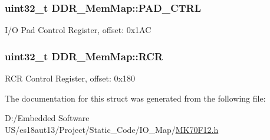 \subsubsection[{P\+A\+D\+\_\+\+C\+T\+R\+L}]{\setlength{\rightskip}{0pt plus 5cm}uint32\+\_\+t D\+D\+R\+\_\+\+Mem\+Map\+::\+P\+A\+D\+\_\+\+C\+T\+R\+L}\label{struct_d_d_r___mem_map_abeb11d4cc28f5bb277d0cd4a46cb2ce1}
I/\+O Pad Control Register, offset\+: 0x1\+A\+C \hypertarget{struct_d_d_r___mem_map_a46f3bdf0cbb782701ad3edd860cfb667}{}
\subsubsection[{R\+C\+R}]{\setlength{\rightskip}{0pt plus 5cm}uint32\+\_\+t D\+D\+R\+\_\+\+Mem\+Map\+::\+R\+C\+R}\label{struct_d_d_r___mem_map_a46f3bdf0cbb782701ad3edd860cfb667}
R\+C\+R Control Register, offset\+: 0x180 

The documentation for this struct was generated from the following file\+:\begin{DoxyCompactItemize}
\item 
D\+:/\+Embedded Software U\+S/es18aut13/\+Project/\+Static\+\_\+\+Code/\+I\+O\+\_\+\+Map/\hyperlink{_m_k70_f12_8h}{M\+K70\+F12.\+h}\end{DoxyCompactItemize}
